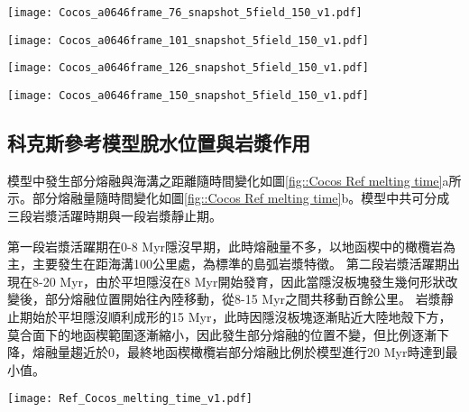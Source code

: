 \begin{figure*}[htp]
    \centering
    \texttt{[image: Cocos\_a0646frame\_76\_snapshot\_5field\_150\_v1.pdf]}
    \caption[科克斯參考模型於15 Myr時之結果]{科克斯參考模型於15 Myr時之結果。}
    \label{fig::Ref Cocos 76}
\end{figure*}

\begin{figure*}[htp]
    \centering
    \texttt{[image: Cocos\_a0646frame\_101\_snapshot\_5field\_150\_v1.pdf]}
    \caption[科克斯參考模型於20 Myr時之結果]{科克斯參考模型於20 Myr時之結果。}
    \label{fig::Ref Cocos 101}
\end{figure*}

\begin{figure*}[htp]
    \centering
    \texttt{[image: Cocos\_a0646frame\_126\_snapshot\_5field\_150\_v1.pdf]}
    \caption[科克斯參考模型於25 Myr時之結果]{科克斯參考模型於25 Myr時之結果。}
    \label{fig::Ref Cocos 126}
\end{figure*}

\begin{figure*}[htp]
    \centering
    \texttt{[image: Cocos\_a0646frame\_150\_snapshot\_5field\_150\_v1.pdf]}
    \caption[科克斯參考模型於30 Myr時之結果]{科克斯參考模型於30 Myr時之結果。}
    \label{fig::Ref Cocos 150}
\end{figure*}

\newpage
\subsection{科克斯參考模型脫水位置與岩漿作用}
模型中發生部分熔融與海溝之距離隨時間變化如圖\ref{fig::Cocos Ref melting time}a所示。部分熔融量隨時間變化如圖\ref{fig::Cocos Ref melting time}b。模型中共可分成三段岩漿活躍時期與一段岩漿靜止期。

第一段岩漿活躍期在0-8 Myr隱沒早期，此時熔融量不多，以地函楔中的橄欖岩為主，主要發生在距海溝100公里處，為標準的島弧岩漿特徵。
第二段岩漿活躍期出現在8-20 Myr，由於平坦隱沒在8 Myr開始發育，因此當隱沒板塊發生幾何形狀改變後，部分熔融位置開始往內陸移動，從8-15 Myr之間共移動百餘公里。
岩漿靜止期始於平坦隱沒順利成形的15 Myr，此時因隱沒板塊逐漸貼近大陸地殼下方，莫合面下的地函楔範圍逐漸縮小，因此發生部分熔融的位置不變，但比例逐漸下降，熔融量趨近於0，最終地函楔橄欖岩部分熔融比例於模型進行20 Myr時達到最小值。
\begin{figure*}[h]
    \centering
    \texttt{[image: Ref\_Cocos\_melting\_time\_v1.pdf]}
    \caption[科克斯參考模型岩漿作用隨時間變化]{科克斯參考模型岩漿作用隨時間變化，灰色底標出平坦隱沒發育後時間段。(a)部分熔融與海溝之距離隨時間變化圖，縱軸中每個點代表每次部分熔融發生位置，顏色為指數上的部分熔融比例。(b)岩石熔融量隨時間變化圖，熔融量單位為每單位海溝產生之立方公里量中每20萬年瞬時量。顏色代表不同岩相。}
    \label{fig::Cocos Ref melting time}
\end{figure*}

